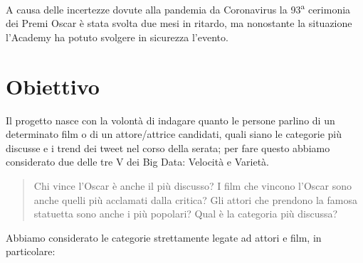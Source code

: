 \documentclass[11pt,a4paper]{report}
\begin{document}
A causa delle incertezze dovute alla pandemia da Coronavirus la 93\textsuperscript{a} cerimonia dei Premi Oscar è stata svolta due mesi in ritardo, ma nonostante la situazione l'Academy ha potuto svolgere in sicurezza l'evento.

\chapter{Obiettivo}
Il progetto nasce con la volontà di indagare quanto le persone parlino di un determinato film o di un attore/attrice candidati, quali siano le categorie più discusse e i trend dei tweet nel corso della serata; per fare questo abbiamo considerato due delle tre V dei Big Data: Velocità e Varietà.
\begin{quote}
    Chi vince l'Oscar è anche il più discusso? I film che vincono l'Oscar sono anche quelli più acclamati dalla critica? Gli attori che prendono la famosa statuetta sono anche i più popolari? Qual è la categoria più discussa?
\end{quote}
Abbiamo considerato le categorie strettamente legate ad attori e film, in particolare:
\end{document}
